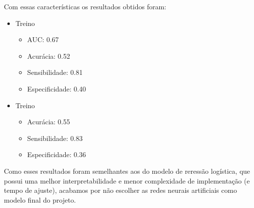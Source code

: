 \documentclass{article}
\begin{document}
Com essas características os resultados obtidos foram:

\begin{itemize}
	\item  Treino
       	\begin{itemize}
       	    \item AUC: 0.67
     		\item Acurácia: 0.52
     		\item Sensibilidade: 0.81
     		\item Especificidade: 0.40
     	\end{itemize}
     \item  Treino
       	\begin{itemize}
       	    \item Acurácia: 0.55
     		\item Sensibilidade: 0.83
     		\item Especificidade: 0.36
       	\end{itemize}
\end{itemize}

Como esses resultados foram semelhantes aos do modelo de reressão logística, que possui uma melhor interpretabilidade e menor complexidade de implementação (e tempo de ajuste), acabamos por não escolher as redes neurais artificiais como modelo final do projeto.
\end{document}
